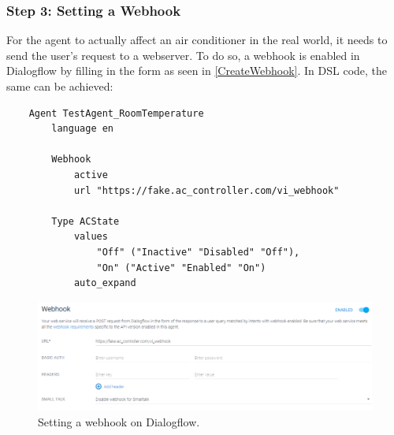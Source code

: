 \subsubsection{Step 3: Setting a Webhook}
For the agent to actually affect an air conditioner in the real world, it needs to send the user's request to a webserver. To do so, a webhook is enabled in Dialogflow by filling in the form as seen in \autoref{CreateWebhook}.
In DSL code, the same can be achieved:
\begin{samepage}
    \begin{lstlisting}
    Agent TestAgent_RoomTemperature
        language en 
            
        Webhook 
            active 
            url "https://fake.ac_controller.com/vi_webhook"

        Type ACState
            values 
                "Off" ("Inactive" "Disabled" "Off"),
                "On" ("Active" "Enabled" "On")
            auto_expand
    \end{lstlisting}
\end{samepage}

\begin{figure}[ht]
    \centering
    \includegraphics[width=1\textwidth]{Thesis_Images/CreateWebhook.PNG}
    \caption{Setting a webhook on Dialogflow.}
        \label{CreateWebhook}
\end{figure}

